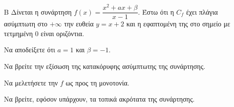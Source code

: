 \begin{thema}{Β}
Δίνεται η συνάρτηση $f(x) = \dfrac{x^2+ax+\beta}{x-1}$. Έστω ότι η $C_f$ έχει πλάγια ασύμπτωτη στο $+\infty$ την ευθεία $y = x+2$ και η εφαπτομένη της στο σημείο με τετμημένη $0$ είναι οριζόντια.
\begin{erwthma}
  \item Να αποδείξετε ότι $a=1$ και $\beta=-1$.
  \item Να βρείτε την εξίσωση της κατακόρυφης ασύμπτωτης της συνάρτησης.
  \item Να μελετήσετε την $f$ ως προς τη μονοτονία.
  \item Να βρείτε, εφόσον υπάρχουν, τα τοπικά ακρότατα της συνάρτησης.
\end{erwthma}
\end{thema}
